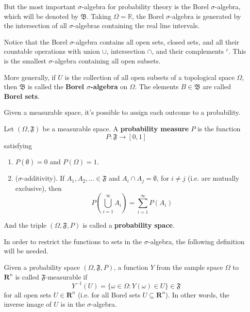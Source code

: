 But the most important $\sigma$-algebra for probability theory is the Borel $\sigma$-algebra, which will be denoted by $\mathfrak{B}$. Taking $\Omega = \mathbb{R}$, the Borel $\sigma$-algebra is generated by the intersection of all $\sigma$-algebras containing the real line intervals.

Notice that the Borel $\sigma$-algebra contains all open sets, closed sets, and all their countable operations with union $\cup$, intersection $\cap$, and their complements $^c$. This is the smallest $\sigma$-algebra containing all open subsets.

More generally, if $U$ is the collection of all open subsets of a topological space $\Omega$, then $\mathfrak{B}$ is called the \textbf{Borel $\sigma$-algebra} on $\Omega$. The elements $B \in \mathfrak{B}$ are called \textbf{Borel sets}.

Given a measurable space, it's possible to assign each outcome to a probability.

\begin{definition}
	Let $(\Omega, \mathfrak{F})$ be a measurable space. A \textbf{probability measure} $P$ is the function
	\[
		P : \mathfrak{F} \longrightarrow [0,1]
	\]
	satisfying
	\begin{enumerate}
		\item $P(\emptyset) = 0$ and $P(\Omega) = 1$.
		\item ($\sigma$-additivity). If $A_1, A_2, \ldots \in \mathfrak{F}$ and $A_i \cap A_j = \emptyset$, for $i \neq j$ (i.e. are mutually exclusive), then \[ P \left( \bigcup_{i=1}^\infty A_i \right) = \sum_{i=1}^\infty P(A_i)\]
	\end{enumerate}
	
	And the triple $(\Omega, \mathfrak{F}, P)$ is called a \textbf{probability space}.
\end{definition}

In order to restrict the functions to sets in the $\sigma$-algebra, the following definition will be needed.

\begin{definition}
	Given a probability space $(\Omega, \mathfrak{F}, P)$, a function $Y$ from the sample space $\Omega$ to $\textbf{R}^n$ is called $\mathfrak{F}$-measurable if
	\[
		Y^{-1}(U) = \{ \omega \in \Omega : Y(\omega) \in U\} \in \mathfrak{F}
	\]
	for all open sets $U \in \textbf{R}^n$ (i.e. for all Borel sets $U \subseteq \textbf{R}^n$). In other words, the inverse image of $U$ is in the $\sigma$-algebra.
\end{definition} 

